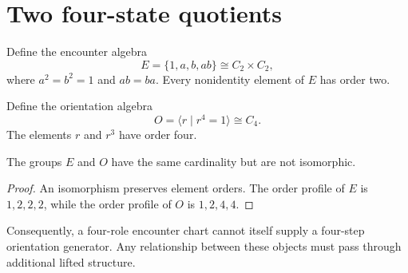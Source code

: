 \section{Two four-state quotients}

Define the encounter algebra
\[
E=\{1,a,b,ab\}\cong C_2\times C_2,
\]
where \(a^2=b^2=1\) and \(ab=ba\). Every nonidentity element of
\(E\) has order two.

Define the orientation algebra
\[
O=\langle r\mid r^4=1\rangle\cong C_4.
\]
The elements \(r\) and \(r^3\) have order four.

\begin{proposition}[Nonidentification]
The groups \(E\) and \(O\) have the same cardinality but are not
isomorphic.
\end{proposition}

\begin{proof}
An isomorphism preserves element orders. The order profile of \(E\) is
\(1,2,2,2\), while the order profile of \(O\) is \(1,2,4,4\).
\end{proof}

Consequently, a four-role encounter chart cannot itself supply a
four-step orientation generator. Any relationship between these
objects must pass through additional lifted structure.
